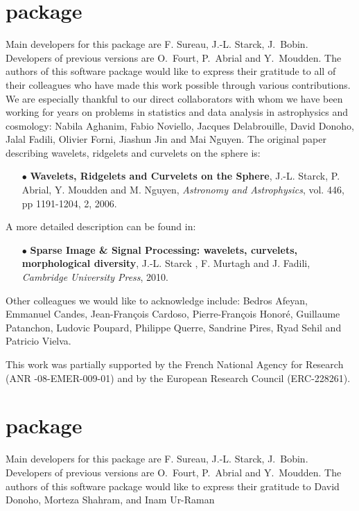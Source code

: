 \section*{\projmrs package}
Main developers for this package are  F. Sureau, J.-L. Starck, J.~Bobin.   
Developers of previous versions are O.~Fourt, P.~Abrial and Y.~Moudden.
The authors of this software package would like to express their 
gratitude to all of their colleagues who have made this work  
possible through various contributions. 
We are especially thankful to our direct collaborators with whom we 
have been working for years on problems in statistics and data 
analysis in astrophysics and cosmology: Nabila Aghanim, Fabio Noviello,  Jacques Delabrouille, David Donoho, Jalal Fadili, 
Olivier Forni, Jiashun Jin and Mai Nguyen.
The original paper describing wavelets, ridgelets and curvelets on the sphere is:
\begin{itemize}
\item[$\bullet$] {\textbf{Wavelets, Ridgelets and Curvelets on the Sphere}, J.-L. Starck, P. Abrial, Y. Moudden and M. Nguyen, \textit{Astronomy and Astrophysics}, vol. 446, pp 1191-1204, 2, 2006.}
\end{itemize}
A more detailed description can be found in:
\begin{itemize}
\item[$\bullet$] {\textbf{Sparse Image \& Signal Processing: wavelets, curvelets, morphological diversity}, J.-L. Starck , F. Murtagh and J. Fadili, \textit{Cambridge University Press},  2010.}
\end{itemize}
Other colleagues we would like to acknowledge include:
Bedros Afeyan, Emmanuel Candes, Jean-Fran{\c{c}}ois  Cardoso,  Pierre-Fran{\c{c}}ois Honor\'e,  Guillaume Patanchon, Ludovic Poupard, Philippe Querre, Sandrine Pires, Ryad Sehil and Patricio Vielva.

This work was partially  supported by the French National Agency for Research (ANR -08-EMER-009-01) and by the European Research Council  (ERC-228261).

\section*{\projpol package}
Main developers for this package are  F. Sureau, J.-L. Starck, J.~Bobin. 
Developers of previous versions are O.~Fourt, P.~Abrial and Y.~Moudden.
The authors of this software package would like to express their 
gratitude to David Donoho, Morteza Shahram, and Inam Ur-Raman 

